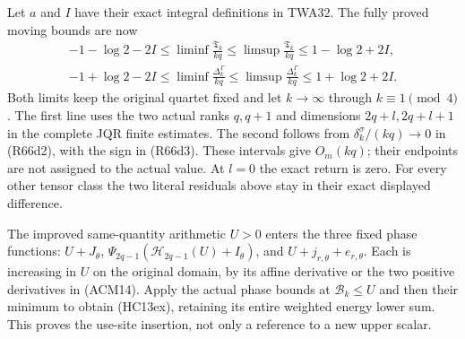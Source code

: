 Let $a$ and $I$ have their exact integral definitions in
TWA32. The fully proved moving bounds are now
\[
\begin{gathered}
 -1-\log2-2I\leq\liminf\frac{\mathfrak T_k}{kq}
 \leq\limsup\frac{\mathfrak T_k}{kq}\leq1-\log2+2I,\\
 -1+\log2-2I\leq\liminf\frac{\Delta_k^\Gamma}{kq}
 \leq\limsup\frac{\Delta_k^\Gamma}{kq}\leq1+\log2+2I.
\end{gathered}\tag{R66d6}
\]
Both limits keep the original quartet fixed and let
$k\to\infty$ through $k\equiv1\pmod4$.
The first line uses the two actual ranks $q,q+1$ and
dimensions $2q+l,2q+l+1$ in the complete JQR finite
estimates. The second follows from
$\delta_k^\sigma/(kq)\to0$ in (R66d2), with the sign
in (R66d3). These intervals give $O_m(kq)$; their
endpoints are not assigned to the actual value.
At $l=0$ the exact return is zero. For every other
tensor class the two literal residuals above stay
in their exact displayed difference.

The improved same-quantity arithmetic $U>0$ enters
the three fixed phase functions:
$U+J_\theta$, $\Psi_{2q-1}(\mathscr H_{2q-1}(U)+I_\theta)$,
and $U+j_{r,\theta}+e_{r,\theta}$.
Each is increasing in $U$ on the original domain, by its
affine derivative or the two positive derivatives in (ACM14).
Apply the actual phase bounds at $\mathcal B_k\leq U$ and
then their minimum to obtain (HC13ex), retaining its entire
weighted energy lower sum. This proves the use-site insertion,
not only a reference to a new upper scalar.


